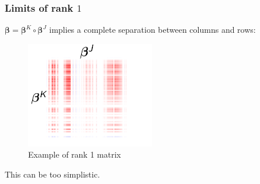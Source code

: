 \documentclass{beamer}
\begin{document}
\begin{frame}
    \frametitle{Limits of rank $1$}
    \vspace{10 pt}
    $\bm{\beta} = \bm{\beta}^K \circ \bm{\beta}^J$ \hspace{0.5 pt} implies a complete separation between columns and rows:
    \begin{figure}
            \centering
            \includegraphics[width=0.5\textwidth]{images/picto_500/heatmap_logistic_multibloc_simu_500_multiway.png}
            \caption{\centering Example of rank 1 matrix}
    \end{figure}
    \begin{center}
        This can be too simplistic.
    \end{center}


\end{frame}
\end{document}
